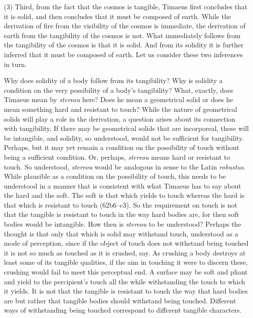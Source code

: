 (3) Third, from the fact that the cosmos is tangible, Timaeus first concludes that it is solid, and then concludes that it must be composed of earth. While the derivation of fire from the visibility of the cosmos is immediate, the derivation of earth from the tangibility of the cosmos is not. What immediately follows from the tangibility of the cosmos is that it is solid. And from its solidity it is further inferred that it must be composed of earth. Let us consider these two inferences in turn. 

Why does solidity of a body follow from its tangibility? Why is solidity a condition on the very possibility of a body's tangibility? What, exactly, does Timaeus mean by \emph{stereou} here? Does he mean a geometrical solid or does he mean something hard and resistant to touch? While the nature of geometrical solids will play a role in the derivation, a question arises about its connection with tangibility. If there may be geometrical solids that are incorporeal, these will be intangible, and solidity, so understood, would not be sufficient for tangibility. Perhaps, but it may yet remain a condition on the possibility of touch without being a sufficient condition. Or, perhaps, \emph{stereou} means hard or resistant to touch. So understood, \emph{stereou} would be analogous in sense to the Latin \emph{robustus}. While plausible as a condition on the possibility of touch, this needs to be understood in a manner that is consistent with what Timaeus has to say about the hard and the soft. The soft is that which yields to touch whereas the hard is that which is resistant to touch (62b6–c3). So the requirement on touch is not that the tangible is resistant to touch in the way hard bodies are, for then soft bodies would be intangible. How then is \emph{stereou} to be understood? Perhaps the thought is that only that which is solid may withstand touch, understood as a mode of perception, since if the object of touch does not withstand being touched it is not so much as touched as it is crushed, say. As crushing a body destroys at least some of its tangible qualities, if the aim in touching it were to discern these, crushing would fail to meet this perceptual end. A surface may be soft and pliant and yield to the percipient's touch all the while withstanding the touch to which it yields. It is not that the tangible is resistant to touch the way that hard bodies are but rather that tangible bodies should withstand being touched. Different ways of withstanding being touched correspond to different tangible characters.

